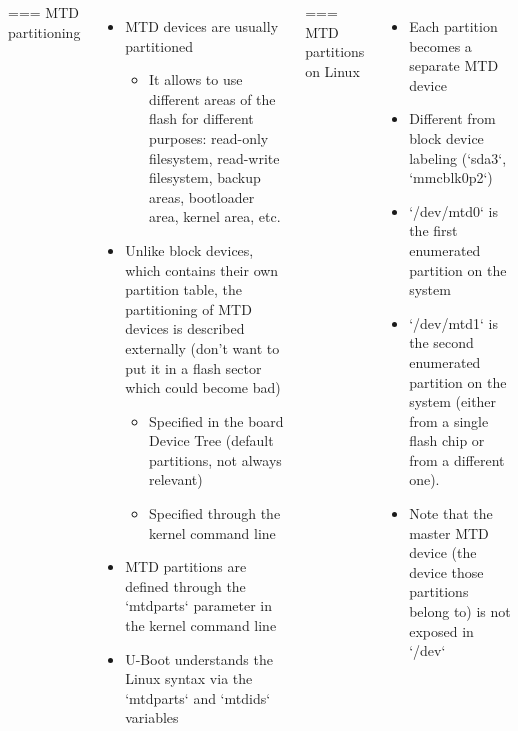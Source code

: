 \begin{columns}
=== MTD partitioning
  \begin{itemize}
  \item MTD devices are usually partitioned
    \begin{itemize}
    \item It allows to use different areas of the flash for different
      purposes: read-only filesystem, read-write filesystem, backup
      areas, bootloader area, kernel area, etc.
    \end{itemize}
  \item Unlike block devices, which contains their own partition
    table, the partitioning of MTD devices is described externally
    (don't want to put it in a flash sector which could become bad)
    \begin{itemize}
    \item Specified in the board Device Tree (default partitions, not always relevant)
    \item Specified through the kernel command line
    \end{itemize}
  \item MTD partitions are defined through the `mtdparts` parameter in
    the kernel command line
  \item U-Boot understands the Linux syntax via the `mtdparts` and
    `mtdids` variables
  \end{itemize}


=== MTD partitions on Linux
  \begin{itemize}
  \item Each partition becomes a separate MTD device
  \item Different from block device labeling (`sda3`,
    `mmcblk0p2`)
  \item `/dev/mtd0` is the first enumerated partition on the system
  \item `/dev/mtd1` is the second enumerated partition on the system
    (either from a single flash chip or from a different one).
  \item Note that the master MTD device (the device those partitions
    belong to) is not exposed in `/dev`
  \end{itemize}



\end{columns}
